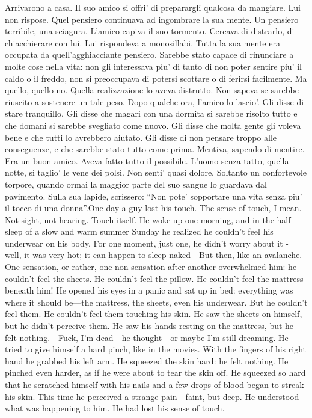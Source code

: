 {Arrivarono a casa. Il suo amico si offri’ di preparargli qualcosa da mangiare. Lui non rispose. Quel pensiero continuava ad ingombrare la sua mente. Un pensiero terribile, una sciagura.
L’amico capiva il suo tormento. Cercava di distrarlo, di chiacchierare con lui. Lui rispondeva a monosillabi. Tutta la sua mente era occupata da quell'agghiacciante pensiero. Sarebbe stato capace di rinunciare a molte cose nella vita: non gli interessava piu’ di tanto di non poter sentire piu’ il caldo o il freddo, non si preoccupava di potersi scottare o di ferirsi facilmente. Ma quello, quello no. Quella realizzazione lo aveva distrutto. Non sapeva se sarebbe riuscito a sostenere un tale peso.
Dopo qualche ora, l’amico lo lascio’. Gli disse di stare tranquillo. Gli disse che magari con una dormita si sarebbe risolto tutto e che domani si sarebbe svegliato come nuovo. Gli disse che molta gente gli voleva bene e che tutti lo avrebbero aiutato. Gli disse di non pensare troppo alle conseguenze, e che sarebbe stato tutto come prima. Mentiva, sapendo di mentire. Era un buon amico. Aveva fatto tutto il possibile.
L’uomo senza tatto, quella notte, si taglio’ le vene dei polsi. Non senti’ quasi dolore. Soltanto un confortevole torpore, quando ormai la maggior parte del suo sangue lo guardava dal pavimento.
Sulla sua lapide, scrissero: “Non pote’ sopportare una vita senza piu' il tocco di una donna”.}{One day a guy lost his touch. The sense of touch, I mean. Not sight, not hearing. Touch itself.
He woke up one morning, and in the half-sleep of a slow and warm summer Sunday he realized he couldn’t feel his underwear on his body. For one moment, just one, he didn’t worry about it - well, it was very hot; it can happen to sleep naked - But then, like an avalanche. One sensation, or rather, one non-sensation after another overwhelmed him: he couldn’t feel the sheets. He couldn’t feel the pillow. He couldn’t feel the mattress beneath him! He opened his eyes in a panic and sat up in bed: everything was where it should be—the mattress, the sheets, even his underwear. But he couldn’t feel them. He couldn’t feel them touching his skin. He saw the sheets on himself, but he didn’t perceive them. He saw his hands resting on the mattress, but he felt nothing.
- Fuck, I’m dead - he thought - or maybe I’m still dreaming.
He tried to give himself a hard pinch, like in the movies. With the fingers of his right hand he grabbed his left arm. He squeezed the skin hard: he felt nothing. He pinched even harder, as if he were about to tear the skin off. He squeezed so hard that he scratched himself with his nails and a few drops of blood began to streak his skin. This time he perceived a strange pain—faint, but deep. He understood what was happening to him. He had lost his sense of touch.
}
